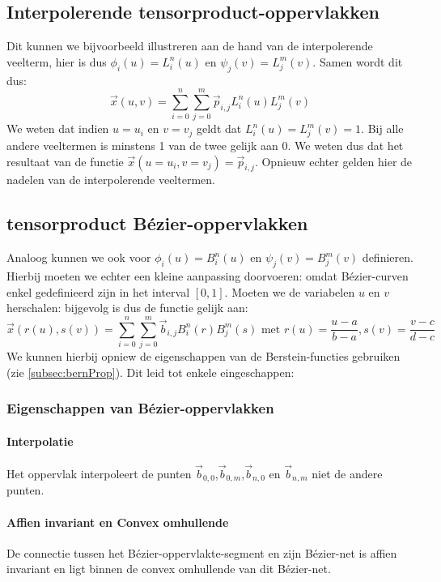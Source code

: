\documentclass[a4paper,titlepage]{article}
\newcommand{\brak}[1]{\left(#1\right)}
\newcommand{\inva}[1]{\left[#1\right]}
\begin{document}
\subsection{Interpolerende tensorproduct-oppervlakken}
Dit kunnen we bijvoorbeeld illustreren aan de hand van de interpolerende veelterm, hier is dus $\phi_i\brak{u}=L_i^n\brak{u}$ en $\psi_j\brak{v}=L_j^m\brak{v}$. Samen wordt dit dus:
\begin{equation}
\vec{x}\brak{u,v}=\displaystyle\sum_{i=0}^n{\displaystyle\sum_{j=0}^m\vec{p}_{i,j}L_i^n\brak{u}L_j^m\brak{v}}
\end{equation}
We weten dat indien $u=u_i$ en $v=v_j$ geldt dat $L_i^n\brak{u}=L_j^m\brak{v}=1$. Bij alle andere veeltermen is minstens 1 van de twee gelijk aan $0$. We weten dus dat het resultaat van de functie $\vec{x}\brak{u=u_i,v=v_j}=\vec{p}_{i,j}$. Opnieuw echter gelden hier de nadelen van de interpolerende veeltermen.
\subsection{tensorproduct B\'ezier-oppervlakken}
Analoog kunnen we ook voor $\phi_i\brak{u}=B_i^n\brak{u}$ en $\psi_j\brak{v}=B_j^m\brak{v}$ definieren. Hierbij moeten we echter een kleine aanpassing doorvoeren: omdat B\'ezier-curven enkel gedefinieerd zijn in het interval $\inva{0,1}$. Moeten we de variabelen $u$ en $v$ herschalen: bijgevolg is dus de functie gelijk aan:
\begin{equation}
\vec{x}\brak{r\brak{u},s\brak{v}}=\displaystyle\sum_{i=0}^n{\displaystyle\sum_{j=0}^m\vec{b}_{i,j}B_i^n\brak{r}B_j^m\brak{s}}\mbox{ met } r\brak{u}=\displaystyle\frac{u-a}{b-a},s\brak{v}=\displaystyle\frac{v-c}{d-c}
\end{equation}
We kunnen hierbij opniew de eigenschappen van de Berstein-functies gebruiken (zie \ref{subsec:bernProp}). Dit leid tot enkele eingeschappen:
\subsubsection{Eigenschappen van B\'ezier-oppervlakken}
\paragraph{Interpolatie}
Het oppervlak interpoleert de punten $\vec{b}_{0,0}$,$\vec{b}_{0,m}$,$\vec{b}_{n,0}$ en $\vec{b}_{n,m}$ niet de andere punten.
\paragraph{Affien invariant en Convex omhullende}
De connectie tussen het B\'ezier-oppervlakte-segment en zijn B\'ezier-net is affien invariant en ligt binnen de convex omhullende van dit B\'ezier-net.
\end{document}
